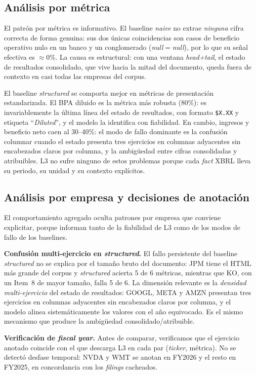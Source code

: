 \documentclass[conference]{IEEEtran}
\begin{document}
\subsection{Análisis por métrica}
El patrón por métrica es informativo. El baseline \textit{naive} no extrae
\emph{ninguna} cifra correcta de forma genuina: sus dos únicas coincidencias son
casos de beneficio operativo nulo en un banco y un conglomerado
(\textit{null}$=$\textit{null}), por lo que su señal efectiva es $\approx$0\%.
La causa es estructural: con una ventana \textit{head+tail}, el estado de
resultados consolidado, que vive hacia la mitad del documento, queda fuera de
contexto en casi todas las empresas del corpus.

El baseline \textit{structured} se comporta mejor en métricas de presentación
estandarizada. El BPA diluido es la métrica más robusta (80\%): es
invariablemente la última línea del estado de resultados, con formato
\texttt{\$X.XX} y etiqueta ``\textit{Diluted}'', y el modelo la identifica con
fiabilidad. En cambio, ingresos y beneficio neto caen al 30--40\%: el modo de
fallo dominante es la confusión columnar cuando el estado presenta tres
ejercicios en columnas adyacentes sin encabezados claros por columna, y la
ambigüedad entre cifras consolidadas y atribuibles. L3 no sufre ninguno de estos
problemas porque cada \textit{fact} XBRL lleva su periodo, su unidad y su
contexto explícitos.

\subsection{Análisis por empresa y decisiones de anotación}
El comportamiento agregado oculta patrones por empresa que conviene explicitar,
porque informan tanto de la fiabilidad de L3 como de los modos de fallo de los
baselines.

\textbf{Confusión multi-ejercicio en \textit{structured}.} El fallo persistente
del baseline \textit{structured} no se explica por el tamaño bruto del documento:
JPM tiene el HTML más grande del corpus y \textit{structured} acierta 5 de 6
métricas, mientras que KO, con un Item~8 de mayor tamaño, falla 5 de 6. La
dimensión relevante es la \emph{densidad multi-ejercicio} del estado de
resultados: GOOGL, META y AMZN presentan tres ejercicios en columnas adyacentes
sin encabezados claros por columna, y el modelo alinea sistemáticamente los
valores con el año equivocado. Es el mismo mecanismo que produce la ambigüedad
consolidado/atribuible.

\textbf{Verificación de \textit{fiscal year}.} Antes de comparar, verificamos que
el ejercicio anotado coincide con el que descarga L3 en cada par
(\textit{ticker}, métrica). No se detectó desfase temporal: NVDA y WMT se anotan
en FY2026 y el resto en FY2025, en concordancia con los \textit{filings}
cacheados.
\end{document}
